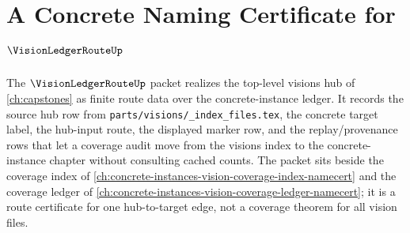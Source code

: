 \chapter{A Concrete Naming Certificate for $\VisionLedgerRouteUp$}
\label{ch:concrete-instances-vision-ledger-route-namecert}

The $\VisionLedgerRouteUp$ packet realizes the top-level visions hub of \autoref{ch:capstones} as finite route data over the concrete-instance ledger. It records the source hub row from \texttt{parts/visions/\_index\_files.tex}, the concrete target label, the hub-input route, the displayed marker row, and the replay/provenance rows that let a coverage audit move from the visions index to the concrete-instance chapter without consulting cached counts. The packet sits beside the coverage index of \autoref{ch:concrete-instances-vision-coverage-index-namecert} and the coverage ledger of \autoref{ch:concrete-instances-vision-coverage-ledger-namecert}; it is a route certificate for one hub-to-target edge, not a coverage theorem for all vision files.

